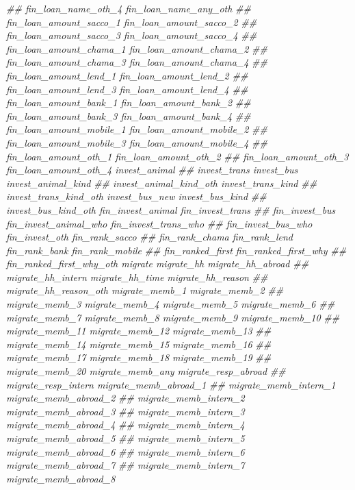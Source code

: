 \documentclass[
]{article}
\newenvironment{Shaded}{\begin{snugshade}}{\end{snugshade}}
\newcommand{\CommentTok}[1]{\textcolor[rgb]{0.56,0.35,0.01}{\textit{#1}}}
\begin{document}
\begin{Shaded}
\begin{Highlighting}[]
\CommentTok{##      fin_loan_name_oth_4 fin_loan_name_any_oth}
\CommentTok{##      fin_loan_amount_sacco_1 fin_loan_amount_sacco_2}
\CommentTok{##      fin_loan_amount_sacco_3 fin_loan_amount_sacco_4}
\CommentTok{##      fin_loan_amount_chama_1 fin_loan_amount_chama_2}
\CommentTok{##      fin_loan_amount_chama_3 fin_loan_amount_chama_4}
\CommentTok{##      fin_loan_amount_lend_1 fin_loan_amount_lend_2}
\CommentTok{##      fin_loan_amount_lend_3 fin_loan_amount_lend_4}
\CommentTok{##      fin_loan_amount_bank_1 fin_loan_amount_bank_2}
\CommentTok{##      fin_loan_amount_bank_3 fin_loan_amount_bank_4}
\CommentTok{##      fin_loan_amount_mobile_1 fin_loan_amount_mobile_2}
\CommentTok{##      fin_loan_amount_mobile_3 fin_loan_amount_mobile_4}
\CommentTok{##      fin_loan_amount_oth_1 fin_loan_amount_oth_2}
\CommentTok{##      fin_loan_amount_oth_3 fin_loan_amount_oth_4 invest_animal}
\CommentTok{##      invest_trans invest_bus invest_animal_kind}
\CommentTok{##      invest_animal_kind_oth invest_trans_kind}
\CommentTok{##      invest_trans_kind_oth invest_bus_new invest_bus_kind}
\CommentTok{##      invest_bus_kind_oth fin_invest_animal fin_invest_trans}
\CommentTok{##      fin_invest_bus fin_invest_animal_who fin_invest_trans_who}
\CommentTok{##      fin_invest_bus_who fin_invest_oth fin_rank_sacco}
\CommentTok{##      fin_rank_chama fin_rank_lend fin_rank_bank fin_rank_mobile}
\CommentTok{##      fin_ranked_first fin_ranked_first_why}
\CommentTok{##      fin_ranked_first_why_oth migrate migrate_hh migrate_hh_abroad}
\CommentTok{##      migrate_hh_intern migrate_hh_time migrate_hh_reason}
\CommentTok{##      migrate_hh_reason_oth migrate_memb_1 migrate_memb_2}
\CommentTok{##      migrate_memb_3 migrate_memb_4 migrate_memb_5 migrate_memb_6}
\CommentTok{##      migrate_memb_7 migrate_memb_8 migrate_memb_9 migrate_memb_10}
\CommentTok{##      migrate_memb_11 migrate_memb_12 migrate_memb_13}
\CommentTok{##      migrate_memb_14 migrate_memb_15 migrate_memb_16}
\CommentTok{##      migrate_memb_17 migrate_memb_18 migrate_memb_19}
\CommentTok{##      migrate_memb_20 migrate_memb_any migrate_resp_abroad}
\CommentTok{##      migrate_resp_intern migrate_memb_abroad_1}
\CommentTok{##      migrate_memb_intern_1 migrate_memb_abroad_2}
\CommentTok{##      migrate_memb_intern_2 migrate_memb_abroad_3}
\CommentTok{##      migrate_memb_intern_3 migrate_memb_abroad_4}
\CommentTok{##      migrate_memb_intern_4 migrate_memb_abroad_5}
\CommentTok{##      migrate_memb_intern_5 migrate_memb_abroad_6}
\CommentTok{##      migrate_memb_intern_6 migrate_memb_abroad_7}
\CommentTok{##      migrate_memb_intern_7 migrate_memb_abroad_8}

\end{Highlighting}
\end{Shaded}
\end{document}
